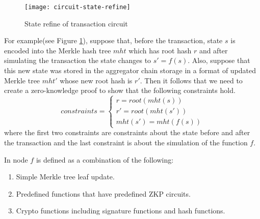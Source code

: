 \begin{figure}[!ht]
\begin{center}
\texttt{[image: circuit-state-refine]}
\end{center}
\caption{State refine of transaction circuit}
\label{circuit-refine}
\end{figure}

For example(see Figure \ref{circuit-refine}), suppose that, before the transaction, state $s$ is encoded into the Merkle hash tree $mht$ which has root hash $r$ and after simulating the transaction the state changes to $s' = f(s)$. Also, suppose that this new state was stored in the aggregator chain storage in a format of updated Merkle tree $mht'$ whose new root hash is $r'$.
Then it follows that we need to create a zero-knowledge proof to show that the following constraints hold.
\[ constraints = \begin{cases}
    r = root(mht(s)) \\
    r' = root(mht(s'))\\
    mht(s') = mht(f(s))
\end{cases} \]
where the first two constraints are constraints about the state before and after the transaction and the last constraint is about the simulation of the function $f$.


In \dprotocol node $f$ is defined as a combination of the following:

\begin{enumerate}[leftmargin=*]
\item Simple Merkle tree leaf update.
\item Predefined functions that have predefined ZKP circuits.
\item Crypto functions including signature functions and hash functions.
\end{enumerate}

